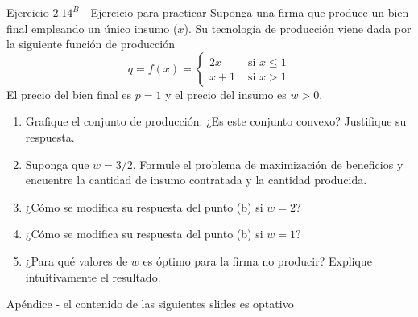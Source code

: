 \documentclass{beamer}
\theoremstyle{definition}
\begin{document}
\begin{frame}{Ejercicio $2.14^B$ - Ejercicio para practicar}
    Suponga una firma que produce un bien final empleando un único insumo ($x$). Su tecnología de producción viene dada por la siguiente función de producción
\begin{equation*}
    q = f(x) = \begin{cases}
    2x & \text{  si  } x \leq 1 \\
    x + 1 & \text{  si  } x > 1
    \end{cases}
\end{equation*}
El precio del bien final es $p=1$ y el precio del insumo es $w>0$.

\begin{enumerate}[label=(\alph*)]
    \item Grafique el conjunto de producción. ¿Es este conjunto convexo? Justifique su respuesta.
    \item Suponga que $w=3/2$. Formule el problema de maximización de beneficios y encuentre la cantidad de insumo contratada y la cantidad producida. 
    \item ¿Cómo se modifica su respuesta del punto (b) si $w=2$?
    \item ¿Cómo se modifica su respuesta del punto (b) si $w=1$?
    \item ¿Para qué valores de $w$ es óptimo para la firma no producir? Explique intuitivamente el resultado.
\end{enumerate}
\end{frame}

\begin{frame}[noframenumbering]{}
   \begin{center}
       \Large Ap\'endice - el contenido de las siguientes slides es optativo
   \end{center} 
\end{frame}
\end{document}

